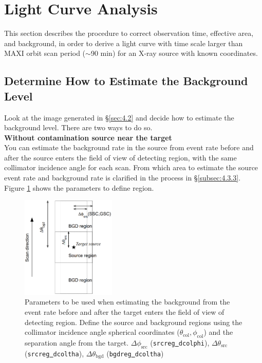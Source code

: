 \documentclass[10pt]{report}
\renewcommand{\_}{\textscale{.5}{\textbf{\textunderscore}}}
\begin{document}
\section{Light Curve Analysis}\label{sec:4.3}

This section describes the procedure to correct observation time, effective area, and background, in order to derive a light curve with time scale larger than MAXI orbit scan period ($\sim$90 min) for an X-ray source with known coordinates. \\

\subsection{Determine How to Estimate the Background Level}\label{subsec:4.3.1}

Look at the image generated in \S\ref{sec:4.2} and decide how to estimate the background level. There are two ways to do so. \\

\noindent \textbf{Without contamination source near the target} \\

You can estimate the background rate in the source from event rate before and after the source enters the field of view of detecting region, with the same collimator incidence angle for each scan. From which area to estimate the source event rate and background rate is clarified in the process in \S \ref{subsec:4.3.3}. Figure \ref{fig:4.2} shows the parameters to define region. \\

\begin{figure}[hbtp!]
  \centering
  \includegraphics[width=0.4\textwidth]{4_2.png}
  \caption{Parameters to be used when estimating the background from the event rate before and after the target enters the field of view of detecting region. Define the source and background regions using the collimator incidence angle spherical coordinates ($\theta_{\text{col}},\phi_{\text{col}}$) and the separation angle from the target. $\Delta\phi_{\text{src}}$ (\texttt{srcreg\underline{ }dcolphi}), $\Delta\theta_{\text{src}}$ (\texttt{srcreg\underline{ }dcoltha}), $\Delta\theta_{\text{bgd}}$ (\texttt{bgdreg\underline{ }dcoltha})}
  \label{fig:4.2}
\end{figure}
\end{document}
